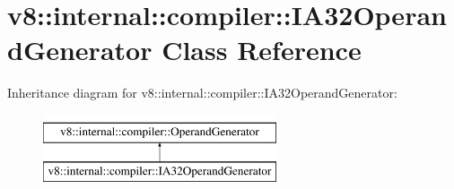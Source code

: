 \hypertarget{classv8_1_1internal_1_1compiler_1_1IA32OperandGenerator}{}\section{v8\+:\+:internal\+:\+:compiler\+:\+:I\+A32\+Operand\+Generator Class Reference}
\label{classv8_1_1internal_1_1compiler_1_1IA32OperandGenerator}
Inheritance diagram for v8\+:\+:internal\+:\+:compiler\+:\+:I\+A32\+Operand\+Generator\+:\begin{figure}[H]
\begin{center}
\leavevmode
\includegraphics[height=2.000000cm]{classv8_1_1internal_1_1compiler_1_1IA32OperandGenerator}
\end{center}
\end{figure}
